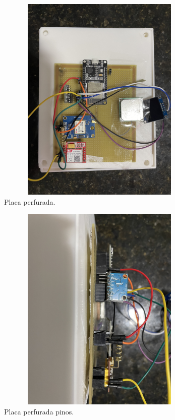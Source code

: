 \begin{figure}[!h]
\centering
\includegraphics[width=10cm, height = 10cm]{capitulos/Figuras/Imagem_Hardware_2.jpg}
\caption{Placa perfurada.}
\label{fig:hardware_placa}
\end{figure}

\begin{figure}[!h]
\centering
\includegraphics[width=10cm, height = 10cm]{capitulos/Figuras/Imagem_Hardware_1.jpg}
\caption{Placa perfurada pinos.}
\label{fig:hardware_pinos}
\end{figure}

